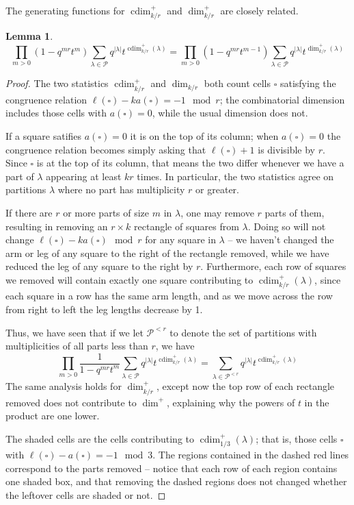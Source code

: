 \documentclass{amsart}[12pt]
\theoremstyle{definition}
\newtheorem{lemma}[dummy]{Lemma}
\newcommand{\PP}{\mathcal{P}} %
\DeclareMathOperator{\cdim}{cdim}
\begin{document}
The generating functions for $\cdim^+_{k/r}$ and $\dim^+_{k/r}$ are closely related.

\begin{lemma}
$$\prod_{m>0}(1-q^{mr}t^m)\sum_{\lambda\in\PP} q^{|\lambda|}t^{\cdim^+_{k/r}(\lambda)}=\prod_{m>0} (1-q^{mr}t^{m-1}) \sum_{\lambda\in\PP} q^{|\lambda|}t^{\dim^+_{k/r}(\lambda)}$$
\end{lemma}
\begin{proof}
The two statistics $\cdim^+_{k/r}$ and $\dim_{k/r}$ both count cells $\square$ satisfying the congruence relation $\ell(\square)-ka(\square)=-1\mod r$; the combinatorial dimension includes those cells with $a(\square)=0$, while the usual dimension does not.  

If a square satifies $a(\square)=0$ it is on the top of its column; when $a(\square)=0$ the congruence relation becomes simply asking that $\ell(\square)+1$ is divisible by $r$. Since $\square$ is at the top of its column, that means the two differ whenever we have a part of $\lambda$ appearing at least $kr$ times.  In particular, the two statistics agree on partitions $\lambda$ where no part has multiplicity $r$ or greater.

If there are $r$ or more parts of size $m$ in $\lambda$, one may remove $r$ parts of them, resulting in removing an $r\times k$ rectangle of squares from $\lambda$.  Doing so will not change $\ell(\square)-ka(\square)\mod r$ for any square in $\lambda$ -- we haven't changed the arm or leg of any square to the right of the rectangle removed, while we have reduced the leg of any square to the right by $r$.  Furthermore, each row of squares we removed will contain exactly one square contributing to $\cdim^+_{k/r}(\lambda)$, since each square in a row has the same arm length, and as we move across the row from right to left the leg lengths decrease by 1.  

Thus, we have seen that if we let $\PP^{<r}$ to denote the set of partitions with multiplicities of all parts less than $r$, we have
$$\prod_{m>0}\frac{1}{1-q^{mr}t^m}\sum_{\lambda\in\PP} q^{|\lambda|}t^{\cdim^+_{k/r}(\lambda)}=\sum_{\lambda\in\PP^{<r}}q^{|\lambda|}t^{\cdim^+_{k/r}(\lambda)}$$
The same analysis holds for $\dim^+_{k/r}$, except now the top row of each rectangle removed does not contribute to $\dim^+$, explaining why the powers of $t$ in the product are one lower.

The shaded cells are the cells contributing to $\cdim^+_{1/3}(\lambda)$; that is, those cells $\square$ with $\ell(\square)-a(\square)=-1\mod 3$.  The regions contained in the dashed red lines correspond to the parts removed -- notice that each row of each region contains one shaded box, and that removing the dashed regions does not changed whether the leftover cells are shaded or not.



\end{proof}
\end{document}
